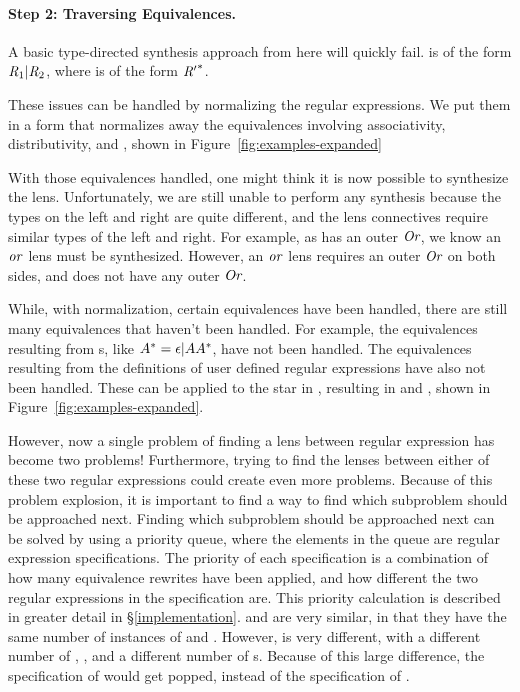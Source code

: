 \documentclass[numbers,10pt,preprint\ifanon ,nocopyrightspace\fi]{sigplanconf}
\begin{document}
\paragraph*{Step 2:  Traversing Equivalences.}

A basic type-directed synthesis approach from here will quickly fail.
 is of the form $\mathit{R}_1|\mathit{R}_2$, where  is of the form
${\mathit{R}'}^*$.

These issues can be handled by normalizing the regular expressions.
We put them in a form that normalizes away the equivalences involving
associativity, distributivity, and \EmptyString{}, shown in
Figure~\ref{fig:examples-expanded}

With those equivalences handled, one might think it is now possible to
synthesize the lens.
Unfortunately, we are still unable to perform any synthesis because the types
on the left and right are quite different, and the lens connectives require
similar types of the left and right.
For example, as  has an outer $\textit{Or}$, we know an $\mathit{or}$ lens must be
synthesized.
However, an $\mathit{or}$ lens requires an outer $\textit{Or}$ on both sides, and  does
not have any outer $\textit{Or}$.

While, with normalization, certain equivalences have been handled, there are
still many equivalences that haven't been handled.
For example, the equivalences resulting from \StarRegexType{}s, like
${A}^*=\epsilon | A{A}^*$, have not been handled.
The equivalences resulting from the definitions of user defined regular
expressions have also not been handled. These can be applied to the star in
, resulting in  and , shown in
Figure~\ref{fig:examples-expanded}.

However, now a single problem of finding a lens between regular expression has
become two problems!  Furthermore, trying to find the lenses between either of these
two regular expressions could create even more problems.  Because of this
problem explosion, it is
important to find a way to find which subproblem should be approached next.
Finding which subproblem should be approached next can be solved by using a
priority queue, where the
elements in the queue are regular expression specifications.  The priority of
each specification is a combination of how many equivalence rewrites have been
applied,
and how different the two regular expressions in the specification are.  This
priority calculation is described in greater detail in
\S\ref{implementation}.
 and  are very similar, in that they have the same
number of instances of  and .  However,  is
very different, with a different number of , , and a
different number of \StarRegexType{}s.  Because of this large difference, the
specification of  would get popped, instead of the
specification of .
\end{document}
